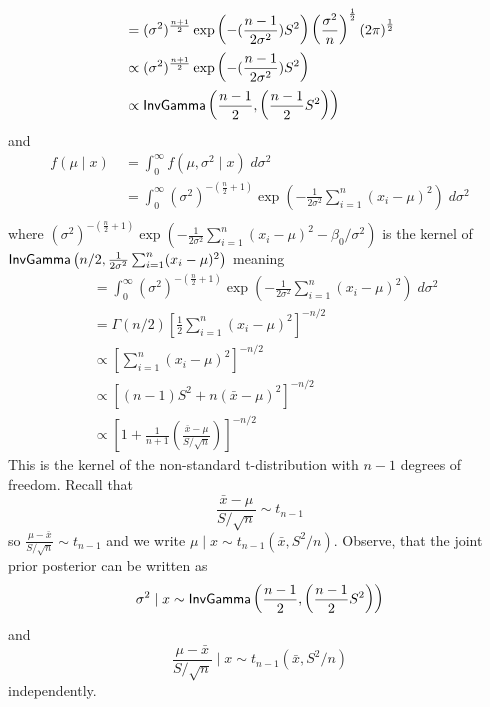 \begin{exam}
\begin{align*}
         & = (\sigma^2)^{\frac{n+1}{2}} \exp \left( - (\frac{n-1}{2 \sigma^2})S^2 \right)  \left( \frac{\sigma^2}{n} \right)^{\frac{1}{2}} \left( 2 \pi \right)^{\frac{1}{2}}            \\
         & \propto (\sigma^2)^{\frac{n+1}{2}} \exp \left( - (\frac{n-1}{2 \sigma^2})S^2 \right)                                                                                          \\
         & \propto {\sf InvGamma} \left( \frac{n-1}{2} , \left( \frac{n-1}{2} S^2 \right) \right)
    \end{align*}
    and
    \begin{align*}
        f(\mu \mid x) \
         & = \int_{0}^{\infty} f(\mu , \sigma^2 \mid x) \; d \sigma^2                                                                               \\
         & = \int_{0}^{\infty} (\sigma^2)^{-(\frac{n}{2} + 1)} \exp \left( - \frac{1}{2\sigma^2} \sum_{i=1}^{n} (x_i - \mu)^2 \right) \; d \sigma^2 \\
    \end{align*}
    where $(\sigma^2)^{-(\frac{n}{2} + 1)} \exp \left( - \frac{1}{2\sigma^2} \sum_{i=1}^{n} (x_i - \mu)^2- \beta_0 / \sigma^2 \right)$ is the kernel of ${\sf InvGamma} \left( n/2 , \frac{1}{2\sigma^2} \sum_{i=1}^{n} (x_i - \mu)^2 \right)$ meaning
    \begin{align*}
         & = \int_{0}^{\infty} (\sigma^2)^{-(\frac{n}{2} + 1)} \exp \left( - \frac{1}{2\sigma^2} \sum_{i=1}^{n} (x_i - \mu)^2 \right) \; d \sigma^2 \\
         & = \Gamma (n/2) \left[ \frac{1}{2} \sum_{i=1}^{n} (x_i - \mu)^2 \right]^{-n/2}                                                            \\
         & \propto \left[ \sum_{i=1}^{n} (x_i - \mu)^2 \right]^{-n/2}                                                                               \\
         & \propto \left[ (n-1) S^2 + n (\bar{x} - \mu)^2 \right]^{-n/2}                                                                            \\
         & \propto \left[ 1 + \frac{1}{n+1} \left( \frac{\bar{x} - \mu}{S / \sqrt{n}} \right) \right]^{-n/2}
    \end{align*}
    This is the kernel of the non-standard t-distribution with $n-1$ degrees of freedom. Recall that
    \[
        \frac{\bar{x} - \mu}{S / \sqrt{n}} \sim t_{n-1}
    \]
    so $\frac{\mu - \bar{x}}{S / \sqrt{n}} \sim t_{n-1}$ and we write $\mu \mid x \sim t_{n-1} \left( \bar{x} , S^2 / n \right)$. Observe, that the joint prior posterior can be written as
    \[
        \sigma^2 \mid x \sim {\sf InvGamma} \left( \frac{n-1}{2} , \left( \frac{n-1}{2} S^2 \right) \right)
    \]
    and
    \[
        \frac{\mu - \bar{x}}{S / \sqrt{n}} \mid x \sim t_{n-1} \left( \bar{x} , S^2 / n \right)
    \]
    independently.
\end{exam}


